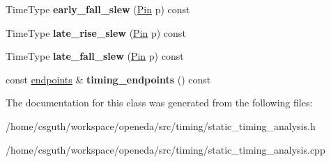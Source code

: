 \begin{DoxyCompactItemize}
\item 
\hypertarget{classophidian_1_1timing_1_1static__timing__analysis_a7865a454c88143a4d2c5eb70f5363dac}{Time\-Type {\bfseries early\-\_\-fall\-\_\-slew} (\hyperlink{classophidian_1_1entity_1_1entity}{Pin} p) const }\label{classophidian_1_1timing_1_1static__timing__analysis_a7865a454c88143a4d2c5eb70f5363dac}

\item 
\hypertarget{classophidian_1_1timing_1_1static__timing__analysis_aad5216c335999dee985a8d8048b557a5}{Time\-Type {\bfseries late\-\_\-rise\-\_\-slew} (\hyperlink{classophidian_1_1entity_1_1entity}{Pin} p) const }\label{classophidian_1_1timing_1_1static__timing__analysis_aad5216c335999dee985a8d8048b557a5}

\item 
\hypertarget{classophidian_1_1timing_1_1static__timing__analysis_a4c9b7ea2e367a8557f8e77410a4c0bf3}{Time\-Type {\bfseries late\-\_\-fall\-\_\-slew} (\hyperlink{classophidian_1_1entity_1_1entity}{Pin} p) const }\label{classophidian_1_1timing_1_1static__timing__analysis_a4c9b7ea2e367a8557f8e77410a4c0bf3}

\item 
\hypertarget{classophidian_1_1timing_1_1static__timing__analysis_ac03ee85b1021876ad1b8ba8f4a0bf64d}{const \hyperlink{classophidian_1_1timing_1_1endpoints}{endpoints} \& {\bfseries timing\-\_\-endpoints} () const }\label{classophidian_1_1timing_1_1static__timing__analysis_ac03ee85b1021876ad1b8ba8f4a0bf64d}

\end{DoxyCompactItemize}


The documentation for this class was generated from the following files\-:\begin{DoxyCompactItemize}
\item 
/home/csguth/workspace/openeda/src/timing/static\-\_\-timing\-\_\-analysis.\-h\item 
/home/csguth/workspace/openeda/src/timing/static\-\_\-timing\-\_\-analysis.\-cpp\end{DoxyCompactItemize}
